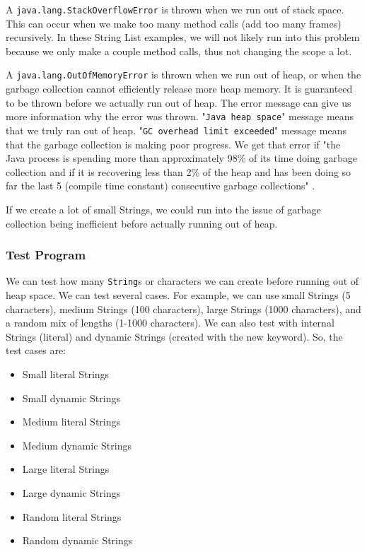 A \texttt{java.lang.StackOverflowError} is thrown when we run out of stack space. This can occur when we make too many method calls (add too many frames) recursively. In these String List examples, we will not likely run into this problem because we only make a couple method calls, thus not changing the scope a lot.

A \texttt{java.lang.OutOfMemoryError} is thrown when we run out of heap, or when the garbage collection cannot efficiently release more heap memory. It is guaranteed to be thrown before we actually run out of heap. The error message can give us more information why the error was thrown. "\texttt{Java heap space}" message means that we truly ran out of heap. "\texttt{GC overhead limit exceeded}" message means that the garbage collection is making poor progress. We get that error if "the Java process is spending more than approximately 98\% of its time doing garbage collection and if it is recovering less than 2\% of the heap and has been doing so far the last 5 (compile time constant) consecutive garbage collections" \cite{gosling}.

If we create a lot of small Strings, we could run into the issue of garbage collection being inefficient before actually running out of heap.

\subsubsection{Test Program}
We can test how many \texttt{String}s or characters we can create before running out of heap space. We can test several cases. For example, we can use small Strings (5 characters), medium Strings (100 characters), large Strings (1000 characters), and a random mix of lengths (1-1000 characters). We can also test with internal Strings (literal) and dynamic Strings (created with the new keyword). So, the test cases are:
\begin{itemize}
\item Small  literal Strings
\item Small dynamic Strings
\item Medium literal Strings
\item Medium dynamic Strings
\item Large literal Strings
\item Large dynamic Strings
\item Random literal Strings
\item Random dynamic Strings
\end{itemize}


